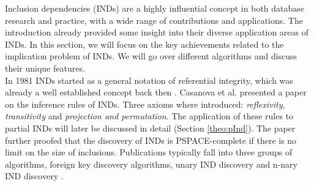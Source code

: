 

Inclusion dependencies (INDs) are a highly influential concept in both database research and practice, with a wide range of contributions and applications. The introduction already provided some insight into their diverse application areas of INDs. In this section, we will focus on the key achievements related to the implication problem of INDs. We will go over different algorithms and discuss their unique features. \\

\noindent In 1981 INDs started as a general notation of referential integrity, which was already a well established concept back then \cite{date1981referential}. Casanova et al. presented a paper on the inference rules of INDs\cite{casanova1982inclusion}. Three axioms where introduced: \textit{reflexivity}, \textit{transitivity} and \textit{projection and permutation}. The application of these rules to partial INDs will later be discussed in detail (Section \ref{theo:pInd}). The paper further proofed that the discovery of INDs is PSPACE-complete if there is no limit on the size of inclusions. Publications typically fall into three groups of algorithms, foreign key discovery algorithms, unary IND discovery and n-nary IND discovery \cite{papenbrock2017data}. \\

